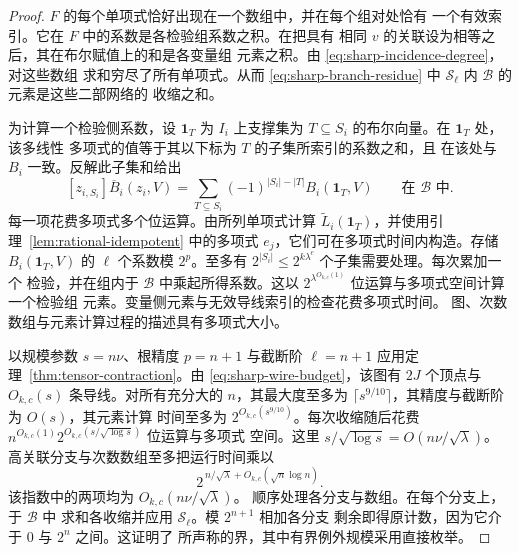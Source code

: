 \begin{proof}
$F$ 的每个单项式恰好出现在一个数组中，并在每个组对处恰有
一个有效索引。它在 $F$ 中的系数是各检验组系数之积。在把具有
相同 $v$ 的关联设为相等之后，其在布尔赋值上的和是各变量组
元素之积。由 \eqref{eq:sharp-incidence-degree}，对这些数组
求和穷尽了所有单项式。从而 \eqref{eq:sharp-branch-residue}
中 $\mathcal S_\ell$ 内 $\mathcal B$ 的元素是这些二部网络的
收缩之和。

为计算一个检验侧系数，设 $\mathbf1_T$ 为 $I_i$ 上支撑集为
$T\subseteq S_i$ 的布尔向量。在 $\mathbf1_T$ 处，该多线性
多项式的值等于其以下标为 $T$ 的子集所索引的系数之和，且
在该处与 $B_i$ 一致。反解此子集和给出
\[
 [z_{i,S_i}]\overline B_i(z_i,V)=
 \sum_{T\subseteq S_i}(-1)^{|S_i|-|T|}B_i(\mathbf1_T,V)
 \qquad\text{在 }\mathcal B\text{ 中}.
\]
每一项花费多项式多个位运算。由所列单项式计算
$\widetilde L_i(\mathbf1_T)$，并使用引理~\ref{lem:rational-idempotent}
中的多项式 $e_j$，它们可在多项式时间内构造。存储
$B_i(\mathbf1_T,V)$ 的 $\ell$ 个系数模 $2^p$。至多有
$2^{|S_i|}\le 2^{k\lambda^c}$ 个子集需要处理。每次累加一个
检验，并在组内于 $\mathcal B$ 中乘起所得系数。这以
$2^{\lambda^{O_{k,c}(1)}}$ 位运算与多项式空间计算一个检验组
元素。变量侧元素与无效导线索引的检查花费多项式时间。
图、次数数组与元素计算过程的描述具有多项式大小。

以规模参数 $s=n\nu$、根精度 $p=n+1$ 与截断阶 $\ell=n+1$
应用定理~\ref{thm:tensor-contraction}。由
\eqref{eq:sharp-wire-budget}，该图有 $2J$ 个顶点与
$O_{k,c}(s)$ 条导线。对所有充分大的 $n$，其最大度至多为
$\lceil s^{9/10}\rceil$，其精度与截断阶为 $O(s)$，其元素计算
时间至多为 $2^{O_{k,c}(s^{9/10})}$。每次收缩随后花费
$n^{O_{k,c}(1)}2^{O_{k,c}(s/\sqrt{\log s})}$ 位运算与多项式
空间。这里 $s/\sqrt{\log s}=O(n\nu/\sqrt\lambda)$。
高关联分支与次数数组至多把运行时间乘以
\[
 2^{\,n/\sqrt{\lambda}+O_{k,c}(\sqrt n\log n)}.
\]
该指数中的两项均为 $O_{k,c}(n\nu/\sqrt{\lambda})$。
顺序处理各分支与数组。在每个分支上，于 $\mathcal B$ 中
求和各收缩并应用 $\mathcal S_\ell$。模 $2^{n+1}$ 相加各分支
剩余即得原计数，因为它介于 $0$ 与 $2^n$ 之间。这证明了
所声称的界，其中有界例外规模采用直接枚举。
\end{proof}

